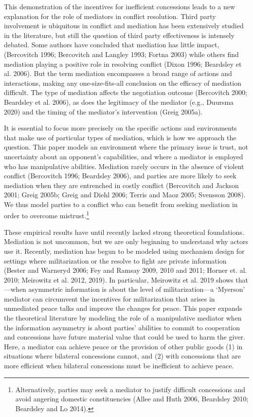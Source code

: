 \documentclass[12pt, letterpaper]{article}
\begin{document}
This demonstration of the incentives for inefficient concessions leads to a new explanation for the role of mediators in conflict resolution. Third party involvement is ubiquitous in conflict and mediation has been extensively studied in the literature, but still the question of third party effectiveness is intensely debated.  Some authors have concluded that mediation has little impact, (Bercovitch 1996;  Bercovitch and Langley 1993; Fortna 2003) while others find mediation playing a positive role in resolving conflict (Dixon 1996; Beardsley et al. 2006).  But the term mediation encompasses a broad range of actions and interactions, making any one-size-fits-all conclusion on the efficacy of mediation difficult. The type of mediation affects the negotiation outcome (Bercovitch 2000; Beardsley et al. 2006), as does the legitimacy of the mediator (e.g., Duursma 2020) and the timing of the mediator's intervention (Greig 2005a).

It is essential to focus more precisely on the specific actions and environments that make use of particular types of mediation, which is how we approach the question. This paper models an environment where the primary issue is trust, not uncertainty about an opponent's capabilities, and where a mediator is employed who has manipulative abilities. Mediation rarely occurs in the absence of violent conflict (Bercovitch 1996; Beardsley 2006), and parties are more likely to seek mediation when they are entrenched in costly conflict (Bercovitch and Jackson 2001; Greig 2005b; Greig and Diehl 2006; Terris and Maoz 2005; Svensson 2008). We thus model parties to a conflict who can benefit from seeking mediation in order to overcome mistrust.\footnote{Alternatively, parties may seek a mediator to justify difficult concessions and avoid angering domestic constituencies (Allee and Huth 2006, Beardsley 2010; Beardsley and Lo 2014).}

These empirical results have until recently lacked strong theoretical foundations. Mediation is not uncommon, but we are only beginning to understand why actors use it. Recently, mediation has begun to be modeled using mechanism design for settings where militarization or the resolve to fight are private information (Bester and Warneryd 2006; Fey and Ramsay 2009, 2010 and 2011; Horner et. al. 2010; Meirowitz et al. 2012, 2019). In particular, Meirowitz et al. 2019 shows that---when asymmetric information is about the level of militarization---a `Myerson' mediator can circumvent the incentives for militarization that arises in unmediated peace talks and improve the changes for peace. This paper expands the theoretical literature by modeling the role of a manipulative mediator when the information asymmetry is about parties' abilities to commit to cooperation and concessions have future material value that could be used to harm the giver. Here, a mediator can achieve peace or the provision of other public goods (1) in situations where bilateral concessions cannot, and (2) with concessions that are more efficient when bilateral concessions must be inefficient to achieve peace. 
\end{document}
